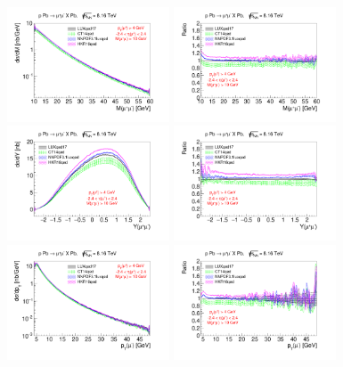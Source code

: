 \begin{figure}[]

\includegraphics[width=0.43\textwidth]{figures/Mll_inc_cut.pdf}
\includegraphics[width=0.43\textwidth]{figures/RatioMll_inc_cut.pdf}
\includegraphics[width=0.43\textwidth]{figures/Yll_inc_cut.pdf}
\includegraphics[width=0.43\textwidth]{figures/RatioYll_inc_cut.pdf}
\includegraphics[width=0.43\textwidth]{figures/pTl_inc_cut.pdf}
\includegraphics[width=0.43\textwidth]{figures/RatiopTl_inc_cut.pdf}

\end{figure}
